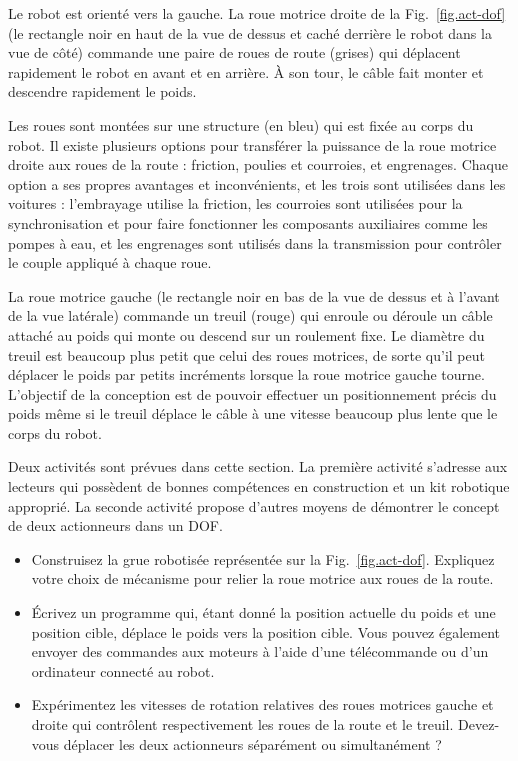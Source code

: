 {Le robot est orienté vers la gauche. La roue motrice droite de la Fig.~\ref{fig.act-dof} (le rectangle noir en haut de la vue de dessus et caché derrière le robot dans la vue de côté) commande une paire de roues de route (grises) qui déplacent rapidement le robot en avant et en arrière. À son tour, le câble fait monter et descendre rapidement le poids.

Les roues sont montées sur une structure (en bleu) qui est fixée au corps du robot. Il existe plusieurs options pour transférer la puissance de la roue motrice droite aux roues de la route : friction, poulies et courroies, et engrenages. Chaque option a ses propres avantages et inconvénients, et les trois sont utilisées dans les voitures : l'embrayage utilise la friction, les courroies sont utilisées pour la synchronisation et pour faire fonctionner les composants auxiliaires comme les pompes à eau, et les engrenages sont utilisés dans la transmission pour contrôler le couple appliqué à chaque roue.

La roue motrice gauche (le rectangle noir en bas de la vue de dessus et à l'avant de la vue latérale) commande un treuil (rouge) qui enroule ou déroule un câble attaché au poids qui monte ou descend sur un roulement fixe. Le diamètre du treuil est beaucoup plus petit que celui des roues motrices, de sorte qu'il peut déplacer le poids par petits incréments lorsque la roue motrice gauche tourne. L'objectif de la conception est de pouvoir effectuer un positionnement précis du poids même si le treuil déplace le câble à une vitesse beaucoup plus lente que le corps du robot.

Deux activités sont prévues dans cette section. La première activité s'adresse aux lecteurs qui possèdent de bonnes compétences en construction et un kit robotique approprié. La seconde activité propose d'autres moyens de démontrer le concept de deux actionneurs dans un DOF.

\begin{framed}
\begin{itemize}
\item Construisez la grue robotisée représentée sur la Fig.~\ref{fig.act-dof}. Expliquez votre choix de mécanisme pour relier la roue motrice aux roues de la route.
\item Écrivez un programme qui, étant donné la position actuelle du poids et une position cible, déplace le poids vers la position cible. Vous pouvez également envoyer des commandes aux moteurs à l'aide d'une télécommande ou d'un ordinateur connecté au robot.
\item Expérimentez les vitesses de rotation relatives des roues motrices gauche et droite qui contrôlent respectivement les roues de la route et le treuil. Devez-vous déplacer les deux actionneurs séparément ou simultanément ?
\end{itemize}
\end{framed}

}
